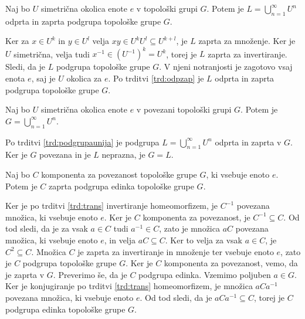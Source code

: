 \documentclass[mat1]{fmfdelo}
\begin{document}
\begin{trditev}\label{trd:podgrupaunija}
Naj bo $U$ simetrična okolica enote $e$ v topološki grupi $G$. Potem je $L = \bigcup_{n=1}^{\infty} U^n$ odprta in zaprta podgrupa topološke grupe $G$.
\end{trditev}

\begin{dokaz}
Ker za $x \in U^k$ in $y \in U^l$ velja $xy \in U^kU^l \subseteq U^{k+l}$, je $L$ zaprta za množenje. Ker je $U$ simetrična, velja tudi $x^{-1} \in (U^{-1})^k = U^k$, torej je $L$ zaprta za invertiranje. Sledi, da je $L$ podgrupa topološke grupe $G$. V njeni notranjosti je zagotovo vsaj enota $e$, saj je $U$ okolica za $e$. Po trditvi \ref{trd:odpzap} je $L$ odprta in zaprta podgrupa topološke grupe $G$.
\end{dokaz}

\begin{posledica}
Naj bo $U$ simetrična okolica enote $e$ v povezani topološki grupi $G$. Potem je $G = \bigcup_{n=1}^{\infty} U^n$.
\end{posledica}

\begin{dokaz}
Po trditvi \ref{trd:podgrupaunija} je podgrupa $L = \bigcup_{n=1}^{\infty} U^n$ odprta in zaprta v $G$. Ker je $G$ povezana in je $L$ neprazna, je $G = L$.
\end{dokaz}

\begin{trditev}\label{trd:povedinka}
Naj bo $C$ komponenta za povezanost topološke grupe $G$, ki vsebuje enoto $e$. Potem je $C$ zaprta podgrupa edinka topološke grupe $G$.
\end{trditev}

\begin{dokaz}
Ker je po trditvi \ref{trd:trans} invertiranje homeomorfizem, je $C^{-1}$ povezana množica, ki vsebuje enoto $e$. Ker je $C$ komponenta za povezanost, je $C^{-1} \subseteq C$. Od tod sledi, da je za vsak $a \in C$ tudi $a^{-1} \in C$, zato je množica $aC$ povezana množica, ki vsebuje enoto $e$, in velja $aC \subseteq C$. Ker to velja za vsak $a \in C$, je $C^2 \subseteq C$. Množica $C$ je zaprta za invertiranje in množenje ter vsebuje enoto $e$, zato je $C$ podgrupa topološke grupe $G$. Ker je $C$ komponenta za povezanost, vemo, da je zaprta v $G$. Preverimo še, da je $C$ podgrupa edinka. Vzemimo poljuben $a \in G$. Ker je konjugiranje po trditvi \ref{trd:trans} homeomorfizem, je množica $aCa^{-1}$ povezana množica, ki vsebuje enoto $e$. Od tod sledi, da je $aCa^{-1} \subseteq C$, torej je $C$ podgrupa edinka topološke grupe $G$.
\end{dokaz}
\end{document}
